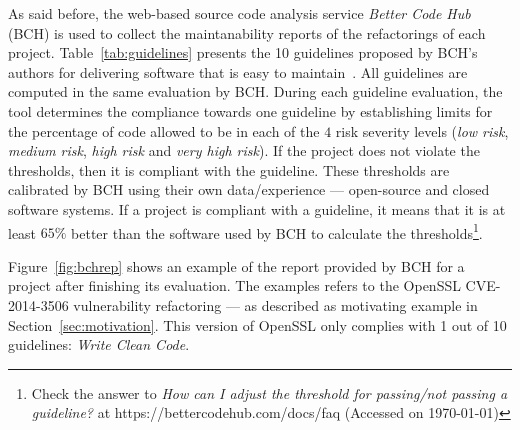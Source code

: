 \documentclass[10pt,conference]{IEEEtran}
\begin{document}
As said before, the web-based source code analysis service \emph{Better Code
Hub} (BCH) is used to collect the maintanability reports of the refactorings of
each project. Table~\ref{tab:guidelines} presents the 10 guidelines
proposed by BCH's authors for delivering software that is easy to maintain~\cite{Visser:2016:OREILLY}. All guidelines are computed in the same evaluation by
BCH. During each guideline evaluation, the tool determines the compliance towards
one guideline by establishing limits for the percentage of code allowed to be in
each of the $4$ risk severity levels (\emph{low risk}, \emph{medium risk}, \emph{high risk}
and \emph{very high risk}). If the project does not violate the thresholds, then it
is compliant with the guideline. These thresholds are calibrated by BCH using
their own data/experience --- open-source and closed software systems. If a
project is compliant with a guideline, it means that it is at least $65\%$
better than the software used by BCH to calculate the thresholds\footnote{Check
the answer to \emph{How can I adjust the threshold for passing/not passing a
guideline?} at https://bettercodehub.com/docs/faq (Accessed on \today{})}.

Figure~\ref{fig:bchrep} shows an example of the report
provided by BCH for a project after finishing its evaluation. The examples
refers to the OpenSSL CVE-2014-3506 vulnerability refactoring ---
as described as motivating example in Section~\ref{sec:motivation}. This
version of OpenSSL only complies with 1 out of 10 guidelines: \emph{Write
Clean Code}.
\end{document}
